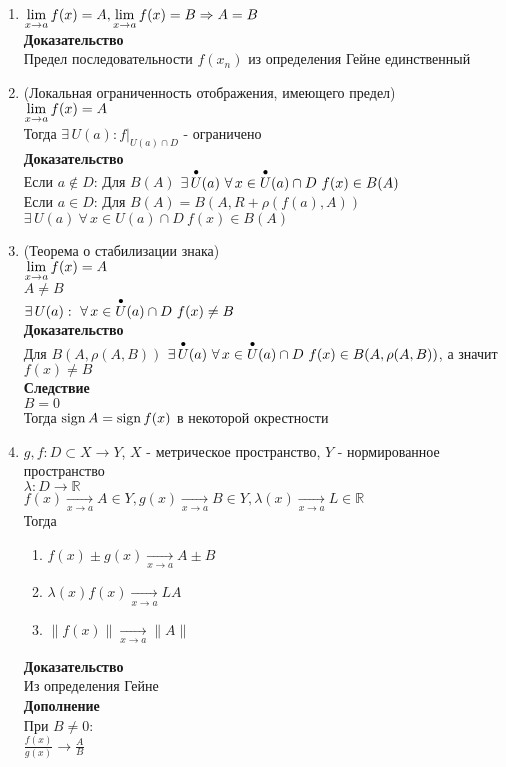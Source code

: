 \documentclass[12pt]{article}
\begin{document}
\begin{enumerate}
    \item $\lim\limits_{x\rightarrow a} f(x) = A, \lim\limits_{x\rightarrow a} f(x) = B \Rightarrow A = B$\\
    \textbf{Доказательство}\\
    Предел последовательности $f(x_n)$ из определения Гейне единственный
    \item (Локальная ограниченность отображения, имеющего предел)\\
    $\lim\limits_{x\rightarrow a} f(x) = A$\\
    Тогда $\exists\,U(a): f|_{U(a)\cap D}$ - ограничено\\
    \textbf{Доказательство}\\
    Если $a \notin D$: Для $B(A)$ $\exists\,\overset{\bullet}{U}(a)\ \forall\,x\in \overset{\bullet}{U}(a)\cap D\ f(x)\in B(A)$\\
    Если $a \in D$: Для $B(A) = B(A,R+\rho(f(a),A))$ $\exists\,U(a)\ \forall\,x\in U(a)\cap D\ f(x)\in B(A)$
    \item (Теорема о стабилизации знака)\\
    $\lim\limits_{x\rightarrow a} f(x) = A$\\
    $A \neq B$\\
    $\exists\,U(a):\ \forall\,x\in \overset{\bullet}{U}(a)\cap D\ f(x) \neq B$\\
    \textbf{Доказательство}\\
    Для $B(A, \rho(A,B))$ $\exists\,\overset{\bullet}{U}(a)\ \forall\,x\in \overset{\bullet}{U}(a)\cap D\ f(x)\in B(A,\rho(A,B))$, а значит $f(x) \neq B$\\
    \textbf{Следствие}\\
    $B = 0$\\
    Тогда $\operatorname{sign} A = \operatorname{sign} f(x)$ в некоторой окрестности
    \item $g,f:D\subset X \rightarrow Y$, $X$ - метрическое пространство, $Y$ - нормированное пространство\\
    $\lambda: D \rightarrow \mathbb{R}$\\
    $f(x) \xrightarrow[x\rightarrow a]{} A \in Y, g(x) \xrightarrow[x\rightarrow a]{} B\in Y, \lambda(x) \xrightarrow[x\rightarrow a]{} L\in \mathbb{R}$\\
    Тогда
    \begin{enumerate}
        \item $f(x)\pm g(x)\xrightarrow[x\rightarrow a]{} A\pm B$
        \item $\lambda(x)f(x)\xrightarrow[x\rightarrow a]{} LA$
        \item $\|f(x)\|\xrightarrow[x\rightarrow a]{} \|A\|$
    \end{enumerate}
    \textbf{Доказательство}\\
    Из определения Гейне\\
    \textbf{Дополнение}\\
    При $B \neq 0$:\\
    $\frac {f(x)}{g(x)} \rightarrow \frac AB$
\end{enumerate}
\end{document}
